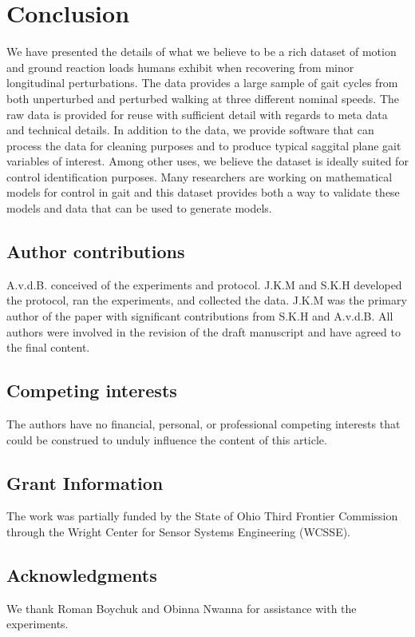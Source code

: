 \documentclass[10pt,a4paper,twocolumn]{article}
\begin{document}
\section*{Conclusion}

We have presented the details of what we believe to be a rich dataset of motion
and ground reaction loads humans exhibit when recovering from minor
longitudinal perturbations. The data provides a large sample of gait cycles
from both unperturbed and perturbed walking at three different nominal speeds.
The raw data is provided for reuse with sufficient detail with regards to meta
data and technical details. In addition to the data, we provide software that
can process the data for cleaning purposes and to produce typical saggital
plane gait variables of interest. Among other uses, we believe the dataset is
ideally suited for control identification purposes. Many researchers are
working on mathematical models for control in gait and this dataset provides
both a way to validate these models and data that can be used to generate
models.

\subsection*{Author contributions}
A.v.d.B. conceived of the experiments and protocol. J.K.M and S.K.H developed
the protocol, ran the experiments, and collected the data. J.K.M was the
primary author of the paper with significant contributions from S.K.H and
A.v.d.B. All authors were involved in the revision of the draft manuscript and
have agreed to the final content.

\subsection*{Competing interests}
The authors have no  financial, personal, or professional competing interests
that could be construed to unduly influence the content of this article.

\subsection*{Grant Information}
The work was partially funded by the State of Ohio Third Frontier Commission
through the Wright Center for Sensor Systems Engineering (WCSSE).

\subsection*{Acknowledgments}
We thank Roman Boychuk and Obinna Nwanna for assistance with the experiments.

\end{document}
